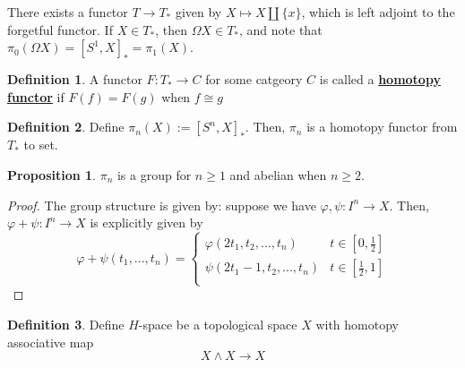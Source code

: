 \documentclass{article}
\theoremstyle{definition}
\theoremstyle{definition}
\newtheorem{definition}{Definition}[theorem]
\theoremstyle{definition}
\theoremstyle{definition}
\newtheorem{proposition}{Proposition}[theorem]
\theoremstyle{definition}
\theoremstyle{definition}
\theoremstyle{definition}
\begin{document}
There exists a functor $T\to T_*$ given by $X\mapsto X\coprod \{x\}$, which is left adjoint to the forgetful functor. If $X\in T_*$, then $\Omega X\in T_*$, and note that $\pi_0(\Omega X)=[S^1,X]_*=\pi_1(X)$. 


\begin{tcolorbox}[colback=purple!5!white,colframe=purple!75!black]
\begin{definition}
A functor $F: T_*\to C$ for some catgeory $C$ is called a \underline{\textbf{homotopy functor}} if $F(f)=F(g)$ when $f\cong g$
\end{definition}
\end{tcolorbox}



\begin{tcolorbox}[colback=purple!5!white,colframe=purple!75!black]
    \begin{definition}
    Define $\pi_n(X):= [S^n, X]_*$. Then, $\pi_n$ is a homotopy functor from $T_*$ to set.
    \end{definition}
    \end{tcolorbox}
    
    
    \begin{tcolorbox}[colback=blue!5!white,colframe=blue!30!white]
    \begin{proposition}
    $\pi_n$ is a group for $n\geq 1$ and abelian when $n\geq 2$. 
    \end{proposition}
    \end{tcolorbox}

    \begin{proof}
        The group structure is given by: suppose we have $\varphi,\psi: I^n\to X$. Then, $\varphi+\psi: I^n\to X$ is explicitly given by 
        \[\varphi+\psi(t_1,...,t_n)=
        \begin{cases}
            \varphi(2t_1,t_2,...,t_n)& t\in [0,\frac{1}{2}]\\
            \psi(2t_1-1,t_2,...,t_n)&t\in  [\frac{1}{2},1]\\
        \end{cases}
        \]
    \end{proof}

    
    \begin{tcolorbox}[colback=purple!5!white,colframe=purple!75!black]
    \begin{definition}
    Define $H$-space be a topological space $X$ with homotopy associative map 
    \[X\wedge X\to X\]
    \end{definition}
    \end{tcolorbox}
\end{document}
